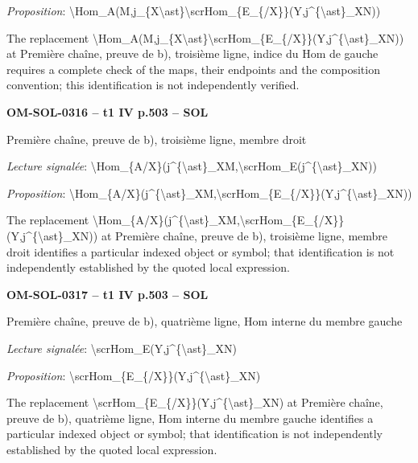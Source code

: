 \emph{Proposition}: \textbackslash{}Hom\_A(M,j\_\{X\textbackslash{}ast\}\textbackslash{}scrHom\_\{E\_\{/X\}\}(Y,j\textasciicircum{}\{\textbackslash{}ast\}\_XN))\par
The replacement \textbackslash{}Hom\_A(M,j\_\{X\textbackslash{}ast\}\textbackslash{}scrHom\_\{E\_\{/X\}\}(Y,j\textasciicircum{}\{\textbackslash{}ast\}\_XN)) at Première chaîne, preuve de b), troisième ligne, indice du Hom de gauche requires a complete check of the maps, their endpoints and the composition convention; this identification is not independently verified.\par
\par\noindent\textbf{OM-SOL-0316 -- t1 IV p.503 -- SOL}\par
Première chaîne, preuve de b), troisième ligne, membre droit\par
\emph{Lecture signalée}: \textbackslash{}Hom\_\{A/X\}(j\textasciicircum{}\{\textbackslash{}ast\}\_XM,\textbackslash{}scrHom\_E(j\textasciicircum{}\{\textbackslash{}ast\}\_XN))\par
\emph{Proposition}: \textbackslash{}Hom\_\{A/X\}(j\textasciicircum{}\{\textbackslash{}ast\}\_XM,\textbackslash{}scrHom\_\{E\_\{/X\}\}(Y,j\textasciicircum{}\{\textbackslash{}ast\}\_XN))\par
The replacement \textbackslash{}Hom\_\{A/X\}(j\textasciicircum{}\{\textbackslash{}ast\}\_XM,\textbackslash{}scrHom\_\{E\_\{/X\}\}(Y,j\textasciicircum{}\{\textbackslash{}ast\}\_XN)) at Première chaîne, preuve de b), troisième ligne, membre droit identifies a particular indexed object or symbol; that identification is not independently established by the quoted local expression.\par
\par\noindent\textbf{OM-SOL-0317 -- t1 IV p.503 -- SOL}\par
Première chaîne, preuve de b), quatrième ligne, Hom interne du membre gauche\par
\emph{Lecture signalée}: \textbackslash{}scrHom\_E(Y,j\textasciicircum{}\{\textbackslash{}ast\}\_XN)\par
\emph{Proposition}: \textbackslash{}scrHom\_\{E\_\{/X\}\}(Y,j\textasciicircum{}\{\textbackslash{}ast\}\_XN)\par
The replacement \textbackslash{}scrHom\_\{E\_\{/X\}\}(Y,j\textasciicircum{}\{\textbackslash{}ast\}\_XN) at Première chaîne, preuve de b), quatrième ligne, Hom interne du membre gauche identifies a particular indexed object or symbol; that identification is not independently established by the quoted local expression.\par

